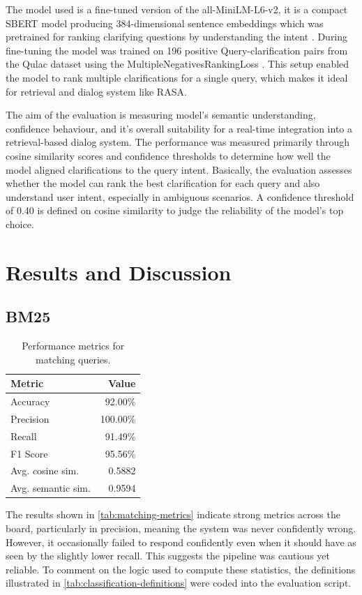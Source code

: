 \documentclass[11pt]{article}
\begin{document}
The model used is a fine-tuned version of the all-MiniLM-L6-v2, it is a compact SBERT model producing 384-dimensional sentence embeddings which was pretrained for ranking clarifying questions by understanding the intent \cite{Tomaarsen2025a}. During fine-tuning the model was trained on 196 positive Query-clarification pairs from the Qulac dataset using the MultipleNegativesRankingLoss \cite{Tomaarsen2025c}. This setup enabled the model to rank multiple clarifications for a single query, which makes it ideal for retrieval and dialog system like RASA. 

The aim of the evaluation is measuring model's semantic understanding, confidence behaviour, and it's overall suitability for a real-time integration into a retrieval-based dialog system. The performance was measured primarily through cosine similarity scores and confidence thresholds to determine how well the model aligned clarifications to the query intent.
Basically, the evaluation assesses whether the model can rank the best clarification for each query and also understand user intent, especially in ambiguous scenarios. A confidence threshold of 0.40 is defined on cosine similarity to judge the reliability of the model's top choice.


\section{Results and Discussion}
\subsection{BM25}

\begin{table}[t]
  \centering
  \begin{tabular}{lr}
    \textbf{Metric} & \textbf{Value} \\
    \hline
    Accuracy & 92.00\% \\
    Precision & 100.00\% \\
    Recall & 91.49\% \\
    F1 Score & 95.56\% \\
    Avg. cosine sim. & 0.5882 \\
    Avg. semantic sim. & 0.9594 \\
  \end{tabular}
  \caption{Performance metrics for matching queries.}
  \label{tab:matching-metrics}
\end{table}

The results shown in \autoref{tab:matching-metrics} indicate strong metrics across the board, particularly in precision, meaning the system was never confidently wrong. However, it occasionally failed to respond confidently even when it should have as seen by the slightly lower recall. This suggests the pipeline was cautious yet reliable.
To comment on the logic used to compute these statistics, the definitions illustrated in \autoref{tab:classification-definitions} were coded into the evaluation script.
\end{document}
